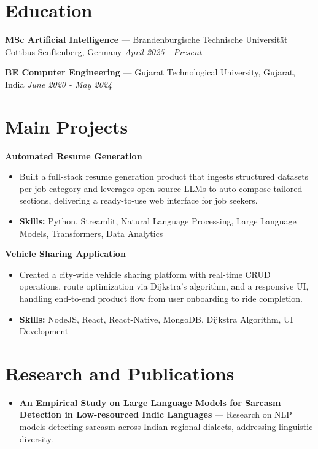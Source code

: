 \documentclass[a4paper,10pt]{article}
\begin{document}
\section*{Education}
\textbf{MSc Artificial Intelligence} — Brandenburgische Technische Universität Cottbus-Senftenberg, Germany \hfill \textit{April 2025 - Present}\par
\vspace{1.5pt}
\textbf{BE Computer Engineering} — Gujarat Technological University, Gujarat, India \hfill \textit{June 2020 - May 2024}\par

\section*{Main Projects}
\textbf{Automated Resume Generation}\par
\vspace{1pt}
\begin{itemize}
  \item Built a full-stack resume generation product that ingests structured datasets per job category and leverages open-source LLMs to auto-compose tailored sections, delivering a ready-to-use web interface for job seekers.
  \item \textbf{Skills:} Python, Streamlit, Natural Language Processing, Large Language Models, Transformers, Data Analytics
\end{itemize}
\vspace{3pt}
\textbf{Vehicle Sharing Application}\par
\vspace{1pt}
\begin{itemize}
  \item Created a city-wide vehicle sharing platform with real-time CRUD operations, route optimization via Dijkstra's algorithm, and a responsive UI, handling end-to-end product flow from user onboarding to ride completion.
  \item \textbf{Skills:} NodeJS, React, React-Native, MongoDB, Dijkstra Algorithm, UI Development
\end{itemize}

\section*{Research and Publications}
\begin{itemize}
\item \textbf{An Empirical Study on Large Language Models for Sarcasm Detection in Low-resourced Indic Languages} — Research on NLP models detecting sarcasm across Indian regional dialects, addressing linguistic diversity.
\end{itemize}
\end{document}
